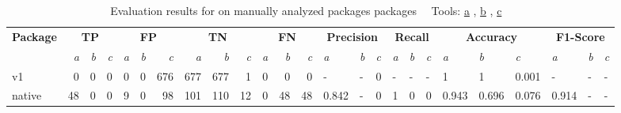 \begin{table}[htp!]
    \centering
    \caption[Evaluation results for \toolSafer{} on manually analyzed packages packages]
        {Evaluation results for \toolSafer{} on manually analyzed packages packages~\newline \tiny ~\newline \footnotesize
        Tools: \underline{a} \toolSafer{}, \underline{b} \toolVet{}, \underline{c} \toolGosec{} \tiny ~\newline}
    \label{tbl:go-safer-evaluation-packages}
    \begin{adjustbox}{max width=\textwidth}
        \begin{tabular}{l||rrr|rrr|rrr|rrr||lll|lll|lll|lll}
            \textbf{Package} & \multicolumn{3}{c|}{\textbf{TP}}                & \multicolumn{3}{c|}{\textbf{FP}}                   & \multicolumn{3}{c|}{\textbf{TN}}                    & \multicolumn{3}{c||}{\textbf{FN}}                  & \multicolumn{3}{c|}{\textbf{Precision}}  & \multicolumn{3}{c|}{\textbf{Recall}}    & \multicolumn{3}{c|}{\textbf{Accuracy}}           & \multicolumn{3}{c}{\textbf{F1-Score}}    \\
            {}               & \textit{a}            & \textit{b} & \textit{c} & \textit{a}             & \textit{b} & \textit{c}   & \textit{a}            & \textit{b}   & \textit{c}   & \textit{a}             & \textit{b}  & \textit{c}  & \textit{a}     & \textit{b} & \textit{c} & \textit{a}    & \textit{b} & \textit{c} & \textit{a}     & \textit{b}     & \textit{c}     & \textit{a}     & \textit{b} & \textit{c} \\
            \hline
            v1               & 0                     & 0          & 0          & 0                      & 0          & 676          & 677                   & 677          & 1            & 0                      & 0           & 0           & -              & -          & 0          & -             & -          & -          & 1              & 1              & 0.001          & -              & -          & -          \\
            \rowcolor{verylightgray}
            native           & 48                    & 0          & 0          & 9                      & 0          & 98           & 101                   & 110          & 12           & 0                      & 48          & 48          & 0.842          & -          & 0          & 1             & 0          & 0          & 0.943          & 0.696          & 0.076          & 0.914          & -          & -          \\

\end{tabular}
\end{adjustbox}
\end{table}
